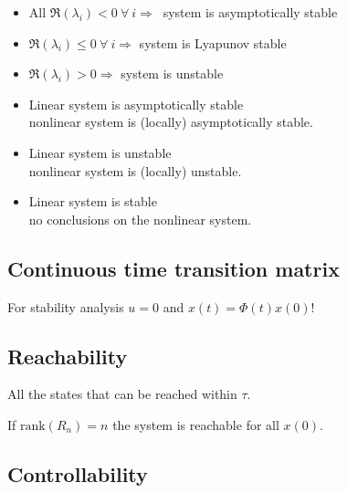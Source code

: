 \documentclass[10pt,a4paper]{scrartcl}
\begin{document}
\begin{multicols*}{3}
\begin{itemize}
\item All $\Re(\lambda_i)<0\ \forall\ i\Rightarrow\ $ system is asymptotically stable
\item $\Re(\lambda_i)\leq0\ \forall\ i\Rightarrow$ system is Lyapunov stable
\item $\Re(\lambda_i)>0\Rightarrow$ system is unstable
\end{itemize}

\begin{itemize}
\item Linear system is asymptotically stable \\ \dahe nonlinear system is (locally) asymptotically stable.
\item Linear system is unstable \\ \dahe nonlinear system is (locally) unstable.
\item Linear system is stable \\ \dahe no conclusions on the nonlinear system.
\end{itemize}

\subsection{Continuous time transition matrix}



For stability analysis $u=0$ and $x(t)=\Phi(t)x(0)$!

\subsection{Reachability}


All the states that can be reached within $\tau$.


If $\text{rank}(R_n)=n$ the system is reachable for all $x(0)$.

\subsection{Controllability}


\end{multicols*}
\end{document}

